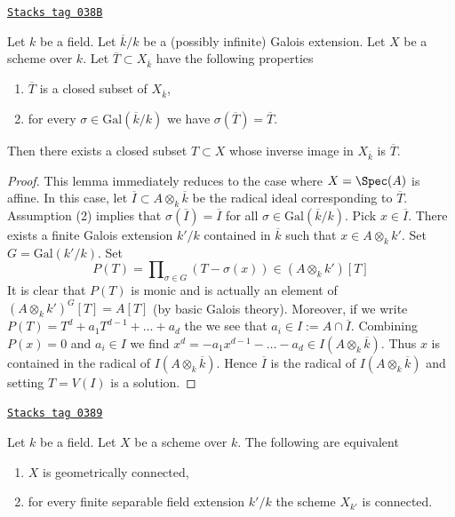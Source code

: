 \begin{lemma}
\label{varieties-lemma-closed-fixed-by-Galois}
\href{https://stacks.math.columbia.edu/tag/038B}{\texttt{Stacks tag 038B}}

Let $k$ be a field. Let $\overline{k}/k$ be a (possibly infinite)
Galois extension. Let $X$ be a scheme over $k$. Let
$\overline{T} \subset X_{\overline{k}}$ have the following properties
\begin{enumerate}
\item $\overline{T}$ is a closed subset of $X_{\overline{k}}$,
\item for every $\sigma \in \text{Gal}(\overline{k}/k)$
we have $\sigma(\overline{T}) = \overline{T}$.
\end{enumerate}
Then there exists a closed subset $T \subset X$ whose inverse image
in $X_{\overline{k}}$ is $\overline{T}$.
\end{lemma}

\begin{proof}
This lemma immediately reduces to the case where $X = \Spec(A)$
is affine. In this case, let $\overline{I} \subset A \otimes_k \overline{k}$
be the radical ideal corresponding to $\overline{T}$.
Assumption (2) implies that $\sigma(\overline{I}) = \overline{I}$
for all $\sigma \in \text{Gal}(\overline{k}/k)$.
Pick $x \in \overline{I}$. There exists a finite Galois extension
$k'/k$ contained in $\overline{k}$ such that $x \in A \otimes_k k'$.
Set $G = \text{Gal}(k'/k)$. Set
$$
P(T) = \prod\nolimits_{\sigma \in G} (T - \sigma(x)) \in (A \otimes_k k')[T]
$$
It is clear that $P(T)$ is monic and is actually an element of
$(A \otimes_k k')^G[T] = A[T]$ (by basic Galois theory).
Moreover, if we write $P(T) = T^d + a_1T^{d - 1} + \ldots + a_d$
the we see that $a_i \in I := A \cap \overline{I}$.
Combining $P(x) = 0$ and $a_i \in I$ we find
$x^d = - a_1 x^{d - 1} - \ldots  - a_d \in I(A \otimes_k \overline{k})$.
Thus $x$ is contained in the radical of $I(A \otimes_k \overline{k})$.
Hence $\overline{I}$ is the radical of $I(A \otimes_k \overline{k})$ and
setting $T = V(I)$ is a solution.
\end{proof}

\begin{lemma}
\label{varieties-lemma-characterize-geometrically-disconnected}
\href{https://stacks.math.columbia.edu/tag/0389}{\texttt{Stacks tag 0389}}

Let $k$ be a field.
Let $X$ be a scheme over $k$.
The following are equivalent
\begin{enumerate}
\item $X$ is geometrically connected,
\item for every finite separable field extension $k'/k$
the scheme $X_{k'}$ is connected.
\end{enumerate}
\end{lemma}


